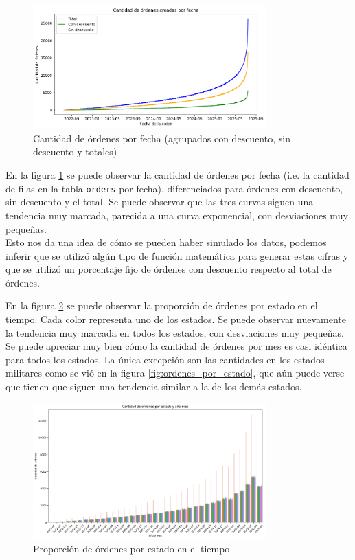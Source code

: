 \begin{figure}[H]
    \centering
    \includegraphics[width=0.8\textwidth]{imagenes/datos_uniformes/cantidad_de_ordenes_por_fecha.png}
    \caption{Cantidad de órdenes por fecha (agrupados con descuento, sin descuento y totales)}
    \label{fig:cantidad_de_ordenes_por_fecha}
\end{figure}

En la figura \ref{fig:cantidad_de_ordenes_por_fecha} se puede observar la cantidad de órdenes por fecha (i.e. la cantidad de filas en la tabla \texttt{orders} por fecha), diferenciados para órdenes con descuento, sin descuento y el total. Se puede observar que las tres curvas siguen una tendencia muy marcada, parecida a una curva exponencial, con desviaciones muy pequeñas. \\
Esto nos da una idea de cómo se pueden haber simulado los datos, podemos inferir que se utilizó algún tipo de función matemática para generar estas cifras y que se utilizó un porcentaje fijo de órdenes con descuento respecto al total de órdenes.

En la figura \ref{fig:ordenes_por_estado_en_el_tiempo} se puede observar la proporción de órdenes por estado en el tiempo. Cada color representa uno de los estados. Se puede observar nuevamente la tendencia muy marcada en todos los estados, con desviaciones muy pequeñas. Se puede apreciar muy bien cómo la cantidad de órdenes por mes es casi idéntica para todos los estados. La única excepción son las cantidades en los estados militares como se vió en la figura \ref{fig:ordenes_por_estado}, que aún puede verse que tienen que siguen una tendencia similar a la de los demás estados.

\begin{figure}[H]
    \centering
    \includegraphics[width=0.8\textwidth]{imagenes/datos_uniformes/ordenes_por_estado_en_el_tiempo.png}
    \caption{Proporción de órdenes por estado en el tiempo}
    \label{fig:ordenes_por_estado_en_el_tiempo}
\end{figure}


